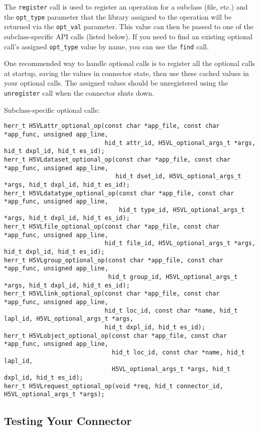 The {\tt register} call is used to register an operation for a subclass (file, etc.)
and the {\tt opt\_type} parameter that the library assigned to the operation will be
returned via the {\tt opt\_val} parameter. This value can then be passed to one
of the subclass-specific API calls (listed below). If you need to find an existing
optional call's assigned {\tt opt\_type} value by name, you can use the {\tt find}
call.

One recommended way to handle optional calls is to register all the optional calls
at startup, saving the values in connector state, then use these cached values
in your optional calls. The assigned values should be unregistered using the
{\tt unregister} call when the connector shuts down.

Subclass-specific optional calls:
\begin{lstlisting}
herr_t H5VLattr_optional_op(const char *app_file, const char *app_func, unsigned app_line,
                            hid_t attr_id, H5VL_optional_args_t *args, hid_t dxpl_id, hid_t es_id);
herr_t H5VLdataset_optional_op(const char *app_file, const char *app_func, unsigned app_line,
                               hid_t dset_id, H5VL_optional_args_t *args, hid_t dxpl_id, hid_t es_id);
herr_t H5VLdatatype_optional_op(const char *app_file, const char *app_func, unsigned app_line,
                                hid_t type_id, H5VL_optional_args_t *args, hid_t dxpl_id, hid_t es_id);
herr_t H5VLfile_optional_op(const char *app_file, const char *app_func, unsigned app_line,
                            hid_t file_id, H5VL_optional_args_t *args, hid_t dxpl_id, hid_t es_id);
herr_t H5VLgroup_optional_op(const char *app_file, const char *app_func, unsigned app_line,
                             hid_t group_id, H5VL_optional_args_t *args, hid_t dxpl_id, hid_t es_id);
herr_t H5VLlink_optional_op(const char *app_file, const char *app_func, unsigned app_line,
                            hid_t loc_id, const char *name, hid_t lapl_id, H5VL_optional_args_t *args,
                            hid_t dxpl_id, hid_t es_id);
herr_t H5VLobject_optional_op(const char *app_file, const char *app_func, unsigned app_line,
                              hid_t loc_id, const char *name, hid_t lapl_id,
                              H5VL_optional_args_t *args, hid_t dxpl_id, hid_t es_id);
herr_t H5VLrequest_optional_op(void *req, hid_t connector_id, H5VL_optional_args_t *args);
\end{lstlisting}

\subsection{Testing Your Connector}

